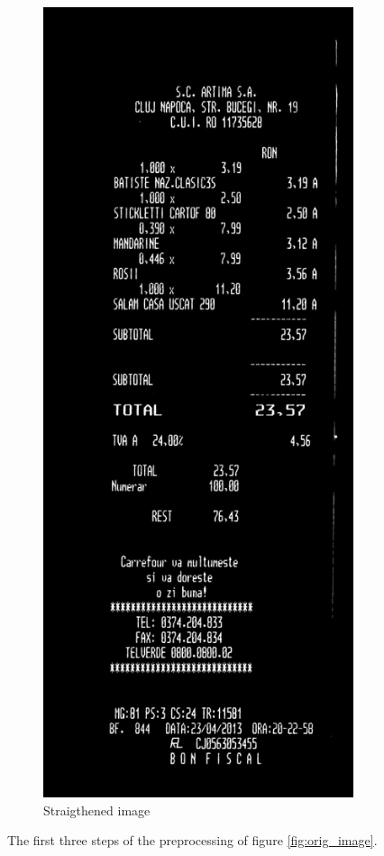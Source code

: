 \begin{figure}
\begin{subfigure}{0.49\linewidth}
  \includegraphics[width=.6\linewidth]{img/straight.jpg}
  \caption{Straigthened image}
  \label{fig:straight_image}
\end{subfigure}
\caption{\label{fig:receipts}
The first three steps of the preprocessing of figure \ref{fig:orig_image}. }
\end{figure}

